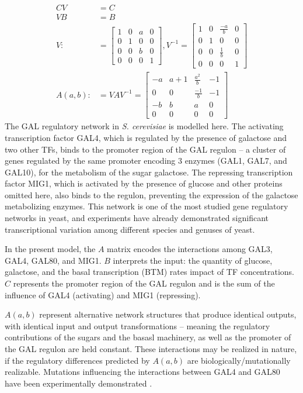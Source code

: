 \documentclass[9 pt]{article}
\newcommand{\1}{\mathbbm{1}}
\begin{document}
    \begin{align*}
      CV &= C \\
      VB &= B \\
      V :&= \begin{bmatrix} 1 & 0 & a & 0 \\ 0 & 1 & 0 & 0 \\ 0 & 0 & b & 0 \\ 0 & 0 & 0 & 1 \end{bmatrix} , V^{-1} = \begin{bmatrix} 1 & 0 & \frac{-a}{b} & 0 \\ 0 & 1 & 0 & 0 \\ 0 & 0 & \frac{1}{b} & 0 \\ 0 & 0 & 0 & 1\end{bmatrix} \\
        A(a,b) :&= VAV^{-1} = \begin{bmatrix} -a & a+1 & \frac{a^{2}}{b} & -1 \\ 0 & 0 & \frac{-1}{b} & -1 \\ -b & b & a & 0 \\ 0 & 0 & 0 & 0 \end{bmatrix}
    \end{align*}
    The GAL regulatory network in \emph{S. cerevisiae} is modelled here. The activating transcription factor GAL4, which is regulated by the presence of galactose and two other TFs, binds to the promoter region of the GAL regulon -- a cluster of genes regulated by the same promoter encoding 3 enzymes (GAL1, GAL7, and GAL10), for the metabolism of the sugar galactose. The repressing transcription factor MIG1, which is activated by the presence of glucose and other proteins omitted here, also binds to the regulon, preventing the expression of the galactose metabolizing enzymes. This network is one of the most studied gene regulatory networks in yeast, and experiments have already demonstrated significant transcriptional variation among different species and genuses of yeast.

    In the present model, the $A$ matrix encodes the interactions among GAL3, GAL4, GAL80, and MIG1. $B$ interprets the input: the quantity of glucose, galactose, and the basal transcription (BTM) rates impact of TF concentrations. $C$ represents the promoter region of the GAL regulon and is the sum of the influence of GAL4 (activating) and MIG1 (repressing).

    $A(a,b)$ represent alternative network structures that produce identical outputs, with identical input and output transformations -- meaning the regulatory contributions of the sugars and the basasl machinery, as well as the promoter of the GAL regulon are held constant. These interactions may be realized in nature, if the regulatory differences predicted by $A(a,b)$ are biologically/mutationally realizable. Mutations influencing the interactions between GAL4 and GAL80 have been experimentally demonstrated \citep{li2010alterations}.
\end{document}
